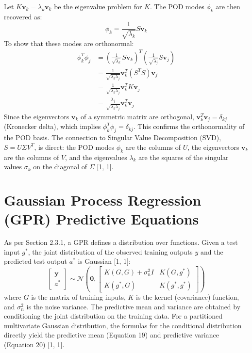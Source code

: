 \documentclass[dsc, EN]{ufabcFHZh}
\begin{document}
{Let $K\mathbf{v}_k = \lambda_k \mathbf{v}_k$ be the eigenvalue problem for $K$. The POD modes $\phi_k$ are then recovered as:
\begin{equation}
    \phi_k = \frac{1}{\sqrt{\lambda_k}} S \mathbf{v}_k
\end{equation}
To show that these modes are orthonormal:
\begin{align*}
    \phi_k^T \phi_j &= \left( \frac{1}{\sqrt{\lambda_k}} S \mathbf{v}_k \right)^T \left( \frac{1}{\sqrt{\lambda_j}} S \mathbf{v}_j \right) \\
    &= \frac{1}{\sqrt{\lambda_k \lambda_j}} \mathbf{v}_k^T (S^T S) \mathbf{v}_j \\
    &= \frac{1}{\sqrt{\lambda_k \lambda_j}} \mathbf{v}_k^T K \mathbf{v}_j \\
    &= \frac{\lambda_j}{\sqrt{\lambda_k \lambda_j}} \mathbf{v}_k^T \mathbf{v}_j
\end{align*}
Since the eigenvectors $\mathbf{v}_k$ of a symmetric matrix are orthogonal, $\mathbf{v}_k^T \mathbf{v}_j = \delta_{kj}$ (Kronecker delta), which implies $\phi_k^T \phi_j = \delta_{kj}$. This confirms the orthonormality of the POD basis. The connection to Singular Value Decomposition (SVD), $S = U\Sigma V^T$, is direct: the POD modes $\phi_k$ are the columns of $U$, the eigenvectors $\mathbf{v}_k$ are the columns of $V$, and the eigenvalues $\lambda_k$ are the squares of the singular values $\sigma_k$ on the diagonal of $\Sigma$ {[1, 1]}.

\section{Gaussian Process Regression (GPR) Predictive Equations}
\label{sec:gpr_derivation}

As per Section 2.3.1, a GPR defines a distribution over functions. Given a test input $g^*$, the joint distribution of the observed training outputs $y$ and the predicted test output $a^*$ is Gaussian {[1, 1]}:
\begin{equation}
    \begin{bmatrix} \mathbf{y} \\ a^* \end{bmatrix} \sim \mathcal{N} \left( \mathbf{0}, \begin{bmatrix} K(G, G) + \sigma_n^2 I & K(G, g^*) \\ K(g^*, G) & K(g^*, g^*) \end{bmatrix} \right)
\end{equation}
where $G$ is the matrix of training inputs, $K$ is the kernel (covariance) function, and $\sigma_n^2$ is the noise variance. The predictive mean and variance are obtained by conditioning the joint distribution on the training data. For a partitioned multivariate Gaussian distribution, the formulas for the conditional distribution directly yield the predictive mean (Equation 19) and predictive variance (Equation 20) {[1, 1]}.

}
\end{document}
